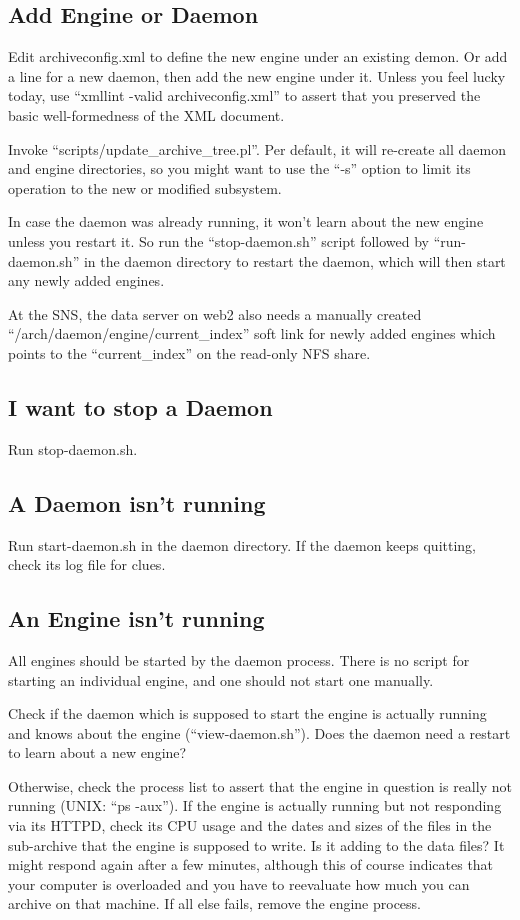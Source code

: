 \subsection{Add Engine or Daemon}
Edit archiveconfig.xml to define the new engine under an existing
demon. Or add a line for a new daemon, then add the new engine under
it.  Unless you feel lucky today, use ``xmllint -valid
archiveconfig.xml'' to assert that you preserved the basic
well-formedness of the XML document.

Invoke ``scripts/update\_archive\_tree.pl''. Per default, it will re-create all
daemon and engine directories, so you might want to use the ``-s''
option to limit its operation to the new or modified subsystem.

In case the daemon was already running, it won't learn about the new
engine unless you restart it. So run the ``stop-daemon.sh'' script
followed by ``run-daemon.sh'' in the daemon directory to restart
the daemon, which will then start any newly added engines.

At the SNS, the data server on web2 also needs a manually created
``/arch/daemon/engine/current\_index'' soft link for newly added
engines which points to the ``current\_index'' on the read-only NFS share.

\subsection{I want to stop a Daemon}
Run stop-daemon.sh.

\subsection{A Daemon isn't running}
Run start-daemon.sh in the daemon directory. If the daemon keeps quitting,
check its log file for clues.

\subsection{An Engine isn't running}
All engines should be started by the daemon process. There is no
script for starting an individual engine, and one should not start one
manually.

Check if the daemon which is supposed to start the engine is actually
running and knows about the engine (``view-daemon.sh''). Does the
daemon need a restart to learn about a new engine?

Otherwise, check the process list to assert that the engine in
question is really not running (UNIX: ``ps -aux''). If the engine is
actually running but not responding via its HTTPD, check its CPU usage
and the dates and sizes of the files in the sub-archive that the
engine is supposed to write. Is it adding to the data files?
It might respond again after a few minutes, although
this of course indicates that your computer is overloaded and you have
to reevaluate how much you can archive on that machine.
If all else fails, remove the engine process.

